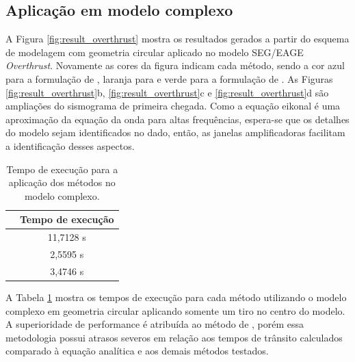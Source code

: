 \subsection{Aplicação em modelo complexo}

A Figura \ref{fig:result_overthrust} mostra os resultados gerados a partir do esquema de modelagem com geometria circular aplicado no modelo SEG/EAGE \textit{Overthrust}. Novamente as cores da figura indicam cada método, sendo a cor azul para a formulação de , laranja para  e verde para a formulação de . As Figuras \ref{fig:result_overthrust}b, \ref{fig:result_overthrust}c e \ref{fig:result_overthrust}d são ampliações do sismograma de primeira chegada. Como a equação eikonal é uma aproximação da equação da onda para altas frequências, espera-se que os detalhes do modelo sejam identificados no dado, então, as janelas amplificadoras facilitam a identificação desses aspectos.    

\begin{table}[H]
	\caption{Tempo de execução para a aplicação dos métodos no modelo complexo.}
	\begin{tabular}{r|c}
		& Tempo de execução \\ \hline
		\citeonline{podvin1991finite} & 11,7128 s  \\ \hline
		\citeonline{jeong2008fast} & 2,5595 s      \\ \hline
		\citeonline{noble2014accurate} & 3,4746 s         
	\end{tabular}
	\label{table_overthrust}
\end{table}

A Tabela \ref{table_overthrust} mostra os tempos de execução para cada método utilizando o modelo complexo em geometria circular aplicando somente um tiro no centro do modelo. A superioridade de performance é atribuída ao método de , porém essa metodologia possui atrasos severos em relação aos tempos de trânsito calculados comparado à equação analítica e aos demais métodos testados.

